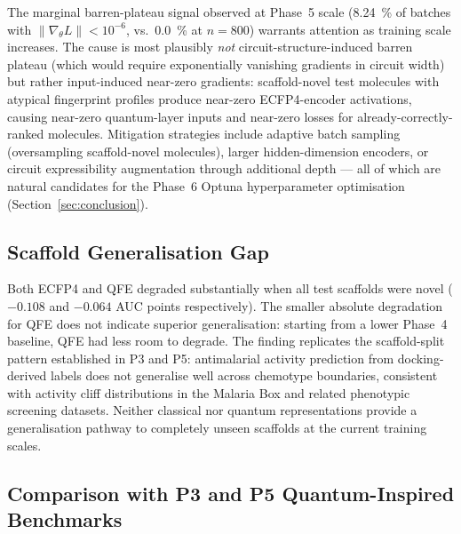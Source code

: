 The marginal barren-plateau signal observed at Phase~5 scale
(\qty{8.24}{\percent} of batches with $\|\nabla_\theta L\| < 10^{-6}$,
vs.\ \qty{0.0}{\percent} at $n = 800$) warrants attention as training scale
increases. The cause is most plausibly \emph{not} circuit-structure-induced
barren plateau (which would require exponentially vanishing gradients in
circuit width\cite{mcclean2018barren}) but rather input-induced near-zero
gradients: scaffold-novel test molecules with atypical fingerprint profiles
produce near-zero ECFP4-encoder activations, causing near-zero
quantum-layer inputs and near-zero losses for already-correctly-ranked
molecules. Mitigation strategies include adaptive batch sampling (oversampling
scaffold-novel molecules), larger hidden-dimension encoders, or circuit
expressibility augmentation through additional depth — all of which are
natural candidates for the Phase~6 Optuna hyperparameter optimisation
(Section~\ref{sec:conclusion}).

\subsection{Scaffold Generalisation Gap}

Both ECFP4 and QFE degraded substantially when all test scaffolds were novel
($-0.108$ and $-0.064$ AUC points respectively). The smaller absolute
degradation for QFE does not indicate superior generalisation: starting from
a lower Phase~4 baseline, QFE had less room to degrade. The finding
replicates the scaffold-split pattern established in P3 and P5: antimalarial
activity prediction from docking-derived labels does not generalise well
across chemotype boundaries, consistent with activity cliff distributions
in the Malaria Box and related phenotypic screening datasets. Neither
classical nor quantum representations provide a generalisation pathway
to completely unseen scaffolds at the current training scales.

\subsection{Comparison with P3 and P5 Quantum-Inspired Benchmarks}

